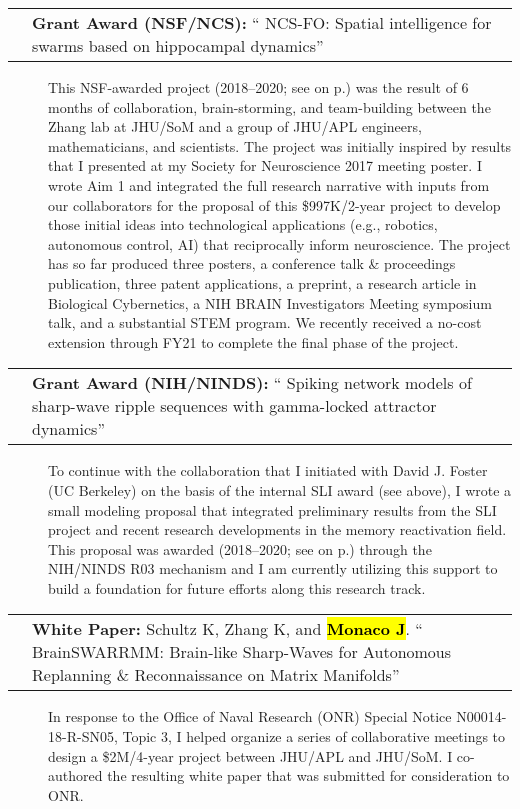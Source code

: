 \documentclass[10pt]{article}
\makeatletter
\newcommand{\unpubtitle}[1]{{\color{hopkinsblue} #1}}
\newcommand{\joehl}[1]{\hl{\textbf{#1}}}
\newcommand{\researchnote}[1]{
  \begin{description}
    \item[] {\hspace{2.2ex}\color{darkgray} #1}
  \end{description}
}
\newcommand{\researchactivity}[4]{
  \begin{minipage}[t]{\textwidth}
    \begin{tabular}{@{\hspace{2ex}}l>{\raggedright\arraybackslash}p{.8\textwidth}}
      \makebox[1.2in][l]{#1} & \textbf{#2:}
      ``\unpubtitle{#3}'' 
    \end{tabular}
  \researchnote{\hspace{1ex} #4}
  \end{minipage}
  \medbreak
}
\newcommand{\whitepaper}[4]{
  \begin{minipage}[t]{\textwidth}
    \begin{tabular}{@{\hspace{2ex}}l>{\raggedright\arraybackslash}p{.8\textwidth}}
      \makebox[1.2in][l]{#1} & \textbf{White Paper:} #2.
      ``\unpubtitle{#3}'' 
    \end{tabular}
  \researchnote{\hspace{1ex} #4}
  \end{minipage}
  \medbreak
}
\makeatother
\begin{document}
\researchactivity
{Nov. 2017-pres.}
{Grant Award (NSF/NCS)}
{NCS-FO: Spatial intelligence for swarms based on hippocampal dynamics}
{This NSF-awarded project (2018--2020; see \emph{\nameref{sec:cursupport}}
  on p.\pageref{sec:cursupport}) was the result of 6 months of collaboration,
  brain-storming, and team-building between the Zhang lab at JHU/SoM and a group
  of JHU/APL engineers, mathematicians, and scientists. The project was initially
  inspired by results that I presented at my Society for Neuroscience 2017 meeting
  poster. I wrote Aim 1 and integrated the full research narrative with inputs
  from our collaborators for the proposal of this \$997K/2-year project to develop
  those initial ideas into technological applications (e.g., robotics, autonomous
  control, AI) that reciprocally inform neuroscience. The project has so far
  produced three posters, a conference talk \& proceedings publication, three
  patent applications, a preprint, a research article in Biological Cybernetics, a
  NIH BRAIN Investigators Meeting symposium talk, and a substantial STEM program.
  We recently received a no-cost extension through FY21 to complete the final
phase of the project.}
\label{sec:resnsf}

\researchactivity
{Jan. 2018-pres.}
{Grant Award (NIH/NINDS)}
{Spiking network models of sharp-wave ripple sequences with gamma-locked
attractor dynamics}
{To continue with the collaboration that I initiated with David J. Foster
  (UC Berkeley) on the basis of the internal SLI award (see above), I wrote
  a small modeling proposal that integrated preliminary results from the SLI
  project and recent research developments in the memory reactivation field.
  This proposal was awarded (2018--2020; see \emph{\nameref{sec:cursupport}}
  on p.\pageref{sec:cursupport}) through the NIH/NINDS R03 mechanism and I am
  currently utilizing this support to build a foundation for future efforts along
this research track.}
\label{sec:resnih}

\whitepaper
{Feb.--Mar. 2018}
{Schultz K, Zhang K, and \joehl{Monaco J}}
{BrainSWARRMM: Brain-like Sharp-Waves for Autonomous Replanning \&
Reconnaissance on Matrix Manifolds}
{In response to the Office of Naval Research (ONR) Special Notice
  N00014-18-R-SN05, Topic 3, I helped organize a series of collaborative meetings
  to design a \$2M/4-year project between JHU/APL and JHU/SoM. I co-authored the
resulting white paper that was submitted for consideration to ONR.}
\end{document}
